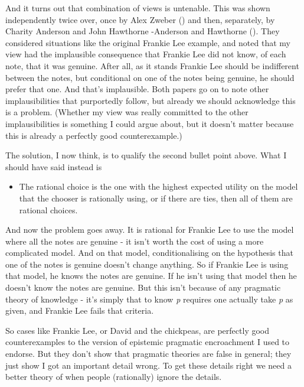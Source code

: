 \documentclass[
  10pt,
  letterpaper,
  DIV=11,
  numbers=noendperiod,
  twoside]{scrartcl}
\providecommand{\tightlist}{%
  \setlength{\itemsep}{0pt}\setlength{\parskip}{0pt}}\usepackage{longtable,booktabs,array}
\begin{document}
And it turns out that combination of views is untenable. This was shown
independently twice over, once by Alex Zweber
() and then, separately, by Charity
Anderson and John Hawthorne -Anderson and Hawthorne
(). They considered
situations like the original Frankie Lee example, and noted that my view
had the implausible consequence that Frankie Lee did not know, of each
note, that it was genuine. After all, as it stands Frankie Lee should be
indifferent between the notes, but conditional on one of the notes being
genuine, he should prefer that one. And that's implausible. Both papers
go on to note other implausibilities that purportedly follow, but
already we should acknowledge this is a problem. (Whether my view was
really committed to the other implausibilities is something I could
argue about, but it doesn't matter because this is already a perfectly
good counterexample.)

The solution, I now think, is to qualify the second bullet point above.
What I should have said instead is

\begin{itemize}
\tightlist
\item
  The rational choice is the one with the highest expected utility on
  the model that the chooser is rationally using, or if there are ties,
  then all of them are rational choices.
\end{itemize}

And now the problem goes away. It is rational for Frankie Lee to use the
model where all the notes are genuine - it isn't worth the cost of using
a more complicated model. And on that model, conditionalising on the
hypothesis that one of the notes is genuine doesn't change anything. So
if Frankie Lee is using that model, he knows the notes are genuine. If
he isn't using that model then he doesn't know the notes are genuine.
But this isn't because of any pragmatic theory of knowledge - it's
simply that to know \emph{p} requires one actually take \emph{p} as
given, and Frankie Lee fails that criteria.

So cases like Frankie Lee, or David and the chickpeas, are perfectly
good counterexamples to the version of epistemic pragmatic encroachment
I used to endorse. But they don't show that pragmatic theories are false
in general; they just show I got an important detail wrong. To get these
details right we need a better theory of when people (rationally) ignore
the details.
\end{document}
